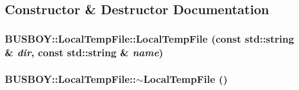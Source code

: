 \subsection{Constructor \& Destructor Documentation}
\hypertarget{classBUSBOY_1_1LocalTempFile_ab2ddb8c9d3a4d426195148ea97f2d8b8}{
\subsubsection[{LocalTempFile}]{\setlength{\rightskip}{0pt plus 5cm}BUSBOY::LocalTempFile::LocalTempFile (const std::string \& {\em dir}, \/  const std::string \& {\em name})}}
\label{classBUSBOY_1_1LocalTempFile_ab2ddb8c9d3a4d426195148ea97f2d8b8}
\hypertarget{classBUSBOY_1_1LocalTempFile_a75897f1cbecb23f5c70000b59edbd822}{
\subsubsection[{$\sim$LocalTempFile}]{\setlength{\rightskip}{0pt plus 5cm}BUSBOY::LocalTempFile::$\sim$LocalTempFile ()}}
\label{classBUSBOY_1_1LocalTempFile_a75897f1cbecb23f5c70000b59edbd822}


